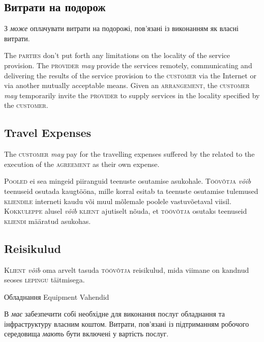 \begin{Form}
\begin{paracol}{3}
{        \subsection{Витрати на подорож}
        З \textit{може} оплачувати витрати  на подорожі, пов'язані із виконанням  як власні витрати. %
        }
        {The \textsc{parties} don't put forth any limitations on the locality of the service provision. The \textsc{provider} \textit{may} provide the services remotely, communicating and delivering the results of the service provision to the \textsc{customer} via the Internet or via another mutually acceptable means. Given an \textsc{arrangement}, the \textsc{customer} \textit{may} temporarily invite the \textsc{provider} to supply services in the locality specified by the \textsc{customer}.

        \subsection{Travel Expenses}
        The \textsc{customer} \textit{may} pay for the travelling expenses suffered by the  related to the execution of the \textsc{agreement} as their own expense.
        }
        {P\textsc{ooled} ei sea mingeid piiranguid teenuste osutamise asukohale. T\textsc{öövõtja} \emph{võib} teenuseid osutada kaugtööna, mille korral esitab ta teenuste osutamise tulemused \textsc{kliendile} interneti kaudu või muul mõlemale poolele vastuvõetaval viisil. K\textsc{okkuleppe} alusel \emph{võib} \textsc{klient} ajutiselt nõuda, et \textsc{töövõtja} osutaks teenuseid \textsc{kliendi} määratud asukohas.

        \subsection{Reisikulud}
        K\textsc{lient} \emph{võib} oma arvelt tasuda \textsc{töövõtja} reisikulud, mida viimane on kandnud seoses \textsc{lepingu} täitmisega.
        }
      \clause
        {Обладнання}
        {Equipment}
        {Vahendid}
        {В \textit{має} забезпечити собі необхідне для виконання послуг обладнання та інфраструктуру власним коштом. Витрати, пов’язані із підтриманням робочого середовища \textit{мають} бути включені  у вартість послуг. 

}
\end{paracol}
\end{Form}
